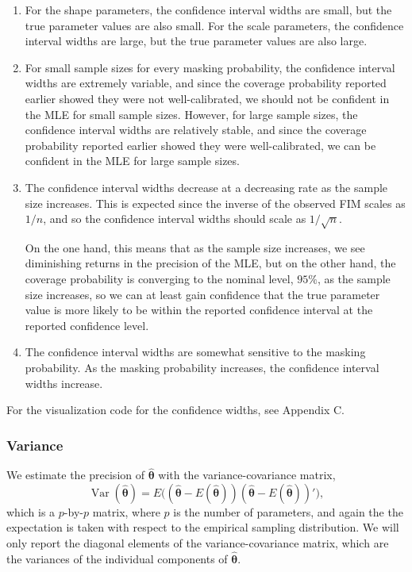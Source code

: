 \documentclass[
]{article}
\begin{document}
\begin{enumerate}
\def\labelenumi{\arabic{enumi}.}
\item
  For the shape parameters, the confidence interval widths are small,
  but the true parameter values are also small. For the scale
  parameters, the confidence interval widths are large, but the true
  parameter values are also large.
\item
  For small sample sizes for every masking probability, the confidence
  interval widths are extremely variable, and since the coverage
  probability reported earlier showed they were not well-calibrated, we
  should not be confident in the MLE for small sample sizes. However,
  for large sample sizes, the confidence interval widths are relatively
  stable, and since the coverage probability reported earlier showed
  they were well-calibrated, we can be confident in the MLE for large
  sample sizes.
\item
  The confidence interval widths decrease at a decreasing rate as the
  sample size increases. This is expected since the inverse of the
  observed FIM scales as \(1/n\), and so the confidence interval widths
  should scale as \(1/\sqrt{n}\).

  On the one hand, this means that as the sample size increases, we see
  diminishing returns in the precision of the MLE, but on the other
  hand, the coverage probability is converging to the nominal level,
  \(95\%\), as the sample size increases, so we can at least gain
  confidence that the true parameter value is more likely to be within
  the reported confidence interval at the reported confidence level.
\item
  The confidence interval widths are somewhat sensitive to the masking
  probability. As the masking probability increases, the confidence
  interval widths increase.
\end{enumerate}

For the visualization code for the confidence widths, see Appendix C.

\hypertarget{variance}{%
\subsubsection{Variance}\label{variance}}

We estimate the precision of \(\boldsymbol{\hat\theta}\) with the
variance-covariance matrix, \[
\operatorname{Var}(\boldsymbol{\hat\theta}) =
    E\bigl(
        (\hat{\boldsymbol{\theta}} - E(\hat{\boldsymbol{\theta}}))
        (\hat{\boldsymbol{\theta}} - E(\hat{\boldsymbol{\theta}}))'
    \bigr),
\] which is a \(p\)-by-\(p\) matrix, where \(p\) is the number of
parameters, and again the the expectation is taken with respect to the
empirical sampling distribution. We will only report the diagonal
elements of the variance-covariance matrix, which are the variances of
the individual components of \(\boldsymbol{\hat\theta}\).
\end{document}
